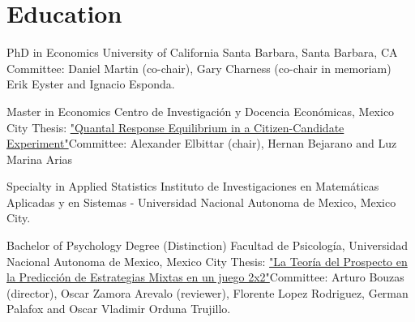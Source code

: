 \section{Education}

{PhD in Economics}
{University of California Santa Barbara, Santa Barbara, CA}
{}{}
{Committee:
	Daniel Martin (co-chair),
	Gary Charness (co-chair in memoriam)
	Erik Eyster and
	Ignacio Esponda.
}

{Master in Economics}
{Centro de Investigación y Docencia Económicas, Mexico City}
{}
{Thesis: \href{http://repositorio-digital.cide.edu/handle/11651/1719?show=full}{"Quantal Response Equilibrium in a Citizen-Candidate Experiment"}}{Committee: Alexander Elbittar (chair), Hernan Bejarano and Luz Marina Arias}

{Specialty in Applied Statistics}
{Instituto de Investigaciones en Matemáticas Aplicadas y en Sistemas - Universidad Nacional Autonoma de Mexico, Mexico City.}
{}{}{}{}

{Bachelor of Psychology Degree (Distinction)}
{Facultad de Psicología, Universidad Nacional Autonoma de Mexico, Mexico City}
{}{Thesis: \href{http://132.248.9.195/ptd2013/noviembre/0706151/Index.html}{"La Teoría del Prospecto en la Predicción de Estrategias Mixtas en un juego 2x2"}}{Committee: Arturo Bouzas (director), Oscar Zamora Arevalo (reviewer), Florente Lopez Rodriguez, German Palafox and Oscar Vladimir Orduna Trujillo.}{}  %






